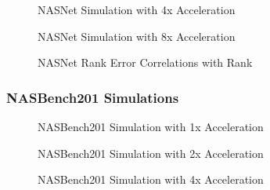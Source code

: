 \documentclass[twocolumn]{article}
\begin{document}
\begin{figure}
    \begin{center}
        
    \end{center}
    \caption{NASNet Simulation with 4x Acceleration}
    \label{fig:nasnet_4x_acceleration}
\end{figure}

\begin{figure}
    \begin{center}
        
    \end{center}
    \caption{NASNet Simulation with 8x Acceleration}
    \label{fig:nasnet_8x_acceleration}
\end{figure}

\begin{figure}
    \begin{center}
        
    \end{center}
    \caption{NASNet Rank Error Correlations with Rank}
    \label{fig:nasnet_rank_error_correlations}
\end{figure}

\FloatBarrier
\clearpage
\subsubsection{NASBench201 Simulations}

\begin{figure}[!h]
    \begin{center}
        
    \end{center}
    \caption{NASBench201 Simulation with 1x Acceleration}
    \label{fig:nasbench_1x_acceleration}
\end{figure}

\begin{figure}
    \begin{center}
        
    \end{center}
    \caption{NASBench201 Simulation with 2x Acceleration}
    \label{fig:nasbench_2x_acceleration}
\end{figure}

\begin{figure}
    \begin{center}
        
    \end{center}
    \caption{NASBench201 Simulation with 4x Acceleration}
    \label{fig:nasbench_4x_acceleration}
\end{figure}
\end{document}
